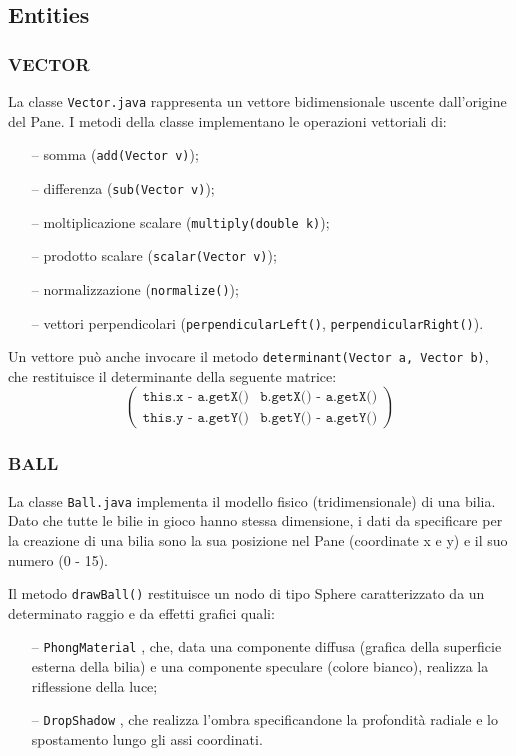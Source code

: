 \documentclass[12pt,a4paper]{report}
\begin{document}
\subsection{Entities} \label{se:Entities} %

\subsubsection*{VECTOR}
La classe \texttt{Vector.java} rappresenta un vettore bidimensionale uscente dall'origine del Pane.
I metodi della classe implementano le operazioni vettoriali di:
\begin{itemize}
	\item [--] somma (\texttt{add(Vector v)});
	\item [--] differenza (\texttt{sub(Vector v)});
	\item [--] moltiplicazione scalare (\texttt{multiply(double k)});
	\item [--] prodotto scalare (\texttt{scalar(Vector v)});
	\item [--] normalizzazione (\texttt{normalize()});
	\item [--] vettori perpendicolari (\texttt{perpendicularLeft()}, \texttt{perpendicularRight()}).
\end{itemize}
Un vettore può anche invocare il metodo \texttt{determinant(Vector a, Vector b)}, che restituisce il determinante della seguente matrice:
\[
\begin{pmatrix}
\texttt{this.x - a.getX()} & \texttt{b.getX() - a.getX()}\\
\texttt{this.y - a.getY()} & \texttt{b.getY() - a.getY()}
\end{pmatrix}
\]

\vspace{3mm}

\subsubsection*{BALL}
La classe \texttt{Ball.java} implementa il modello fisico (tridimensionale) di una bilia.
Dato che tutte le bilie in gioco hanno stessa dimensione, i dati da specificare per la creazione di una bilia sono la sua posizione nel Pane (coordinate x e y) e il suo numero (0 - 15).

\vspace{3mm}

Il metodo \texttt{drawBall()} restituisce un nodo di tipo Sphere caratterizzato da un determinato raggio e da effetti grafici quali:
\begin{itemize}
	\item [--] \texttt{PhongMaterial} \cite{PhongMaterial}, che, data una componente diffusa (grafica della superficie esterna della bilia) e una componente speculare (colore bianco), realizza la riflessione della luce;
	\item [--] \texttt{DropShadow} \cite{DropShadow}, che realizza l'ombra specificandone la profondità radiale e lo spostamento lungo gli assi coordinati.
\end{itemize}
\end{document}
